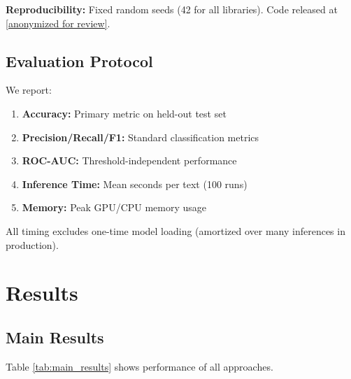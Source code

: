 \documentclass[11pt,a4paper]{article}
\begin{document}
\textbf{Reproducibility:} Fixed random seeds (42 for all libraries). Code released at \url{[anonymized for review]}.

\subsection{Evaluation Protocol}

We report:

\begin{enumerate}
    \item \textbf{Accuracy:} Primary metric on held-out test set
    \item \textbf{Precision/Recall/F1:} Standard classification metrics
    \item \textbf{ROC-AUC:} Threshold-independent performance
    \item \textbf{Inference Time:} Mean seconds per text (100 runs)
    \item \textbf{Memory:} Peak GPU/CPU memory usage
\end{enumerate}

All timing excludes one-time model loading (amortized over many inferences in production).

\section{Results}

\subsection{Main Results}

Table \ref{tab:main_results} shows performance of all approaches.
\end{document}
